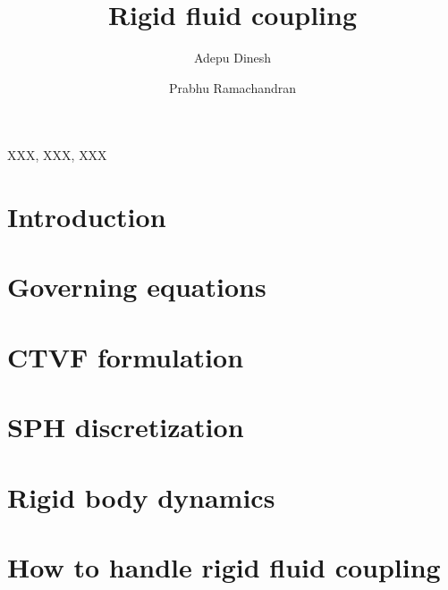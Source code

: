 \documentclass[preprint,12pt]{elsarticle}
\begin{document}
\begin{frontmatter}

  \title{Rigid fluid coupling}
  \author[IITB]{Adepu Dinesh }
   \author[IITB]{Prabhu Ramachandran}
   \address[IITB]{Department of Aerospace
    Engineering, Indian Institute of Technology Bombay, Powai, Mumbai 400076}


\begin{abstract}
\end{abstract}

\begin{keyword}
{XXX}, {XXX}, {XXX}


\end{keyword}

\end{frontmatter}


\section{Introduction}
\label{sec:intro}



\section{Governing equations}
\label{sec:fluid-mechanics}


\section{CTVF formulation}
\label{sec:ctvf-equations}


\section{SPH discretization}
\label{sec:sph-fluid-equations}


\section{Rigid body dynamics}
\label{sec:rbd}


\section{How to handle rigid fluid coupling}
\label{sec:rfc}
\end{document}

